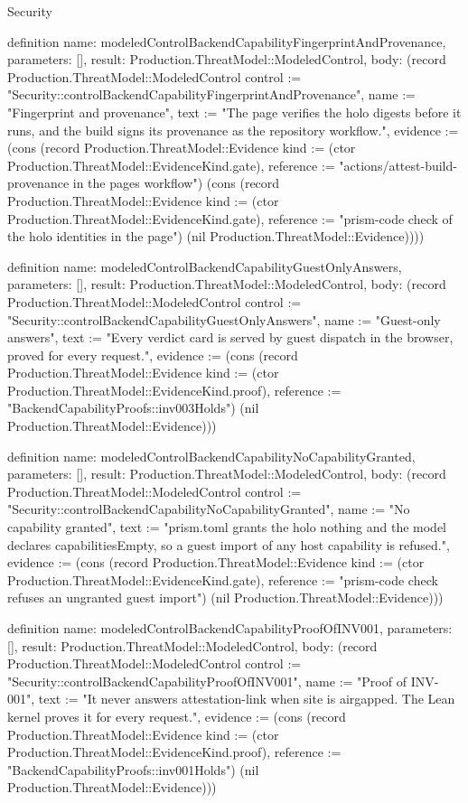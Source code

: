 \begin{lexlean}{Security}
\begin{semanticmodule}
definition{
  name: modeledControlBackendCapabilityFingerprintAndProvenance,
  parameters: [],
  result: Production.ThreatModel::ModeledControl,
  body: (record Production.ThreatModel::ModeledControl {control := "Security::controlBackendCapabilityFingerprintAndProvenance", name := "Fingerprint and provenance", text := "The page verifies the holo digests before it runs, and the build signs its provenance as the repository workflow.", evidence := (cons (record Production.ThreatModel::Evidence {kind := (ctor Production.ThreatModel::EvidenceKind.gate), reference := "actions/attest-build-provenance in the pages workflow"}) (cons (record Production.ThreatModel::Evidence {kind := (ctor Production.ThreatModel::EvidenceKind.gate), reference := "prism-code check of the holo identities in the page"}) (nil Production.ThreatModel::Evidence)))})
}

definition{
  name: modeledControlBackendCapabilityGuestOnlyAnswers,
  parameters: [],
  result: Production.ThreatModel::ModeledControl,
  body: (record Production.ThreatModel::ModeledControl {control := "Security::controlBackendCapabilityGuestOnlyAnswers", name := "Guest-only answers", text := "Every verdict card is served by guest dispatch in the browser, proved for every request.", evidence := (cons (record Production.ThreatModel::Evidence {kind := (ctor Production.ThreatModel::EvidenceKind.proof), reference := "BackendCapabilityProofs::inv003Holds"}) (nil Production.ThreatModel::Evidence))})
}

definition{
  name: modeledControlBackendCapabilityNoCapabilityGranted,
  parameters: [],
  result: Production.ThreatModel::ModeledControl,
  body: (record Production.ThreatModel::ModeledControl {control := "Security::controlBackendCapabilityNoCapabilityGranted", name := "No capability granted", text := "prism.toml grants the holo nothing and the model declares capabilitiesEmpty, so a guest import of any host capability is refused.", evidence := (cons (record Production.ThreatModel::Evidence {kind := (ctor Production.ThreatModel::EvidenceKind.gate), reference := "prism-code check refuses an ungranted guest import"}) (nil Production.ThreatModel::Evidence))})
}

definition{
  name: modeledControlBackendCapabilityProofOfINV001,
  parameters: [],
  result: Production.ThreatModel::ModeledControl,
  body: (record Production.ThreatModel::ModeledControl {control := "Security::controlBackendCapabilityProofOfINV001", name := "Proof of INV-001", text := "It never answers attestation-link when site is airgapped. The Lean kernel proves it for every request.", evidence := (cons (record Production.ThreatModel::Evidence {kind := (ctor Production.ThreatModel::EvidenceKind.proof), reference := "BackendCapabilityProofs::inv001Holds"}) (nil Production.ThreatModel::Evidence))})
}


\end{semanticmodule}
\end{lexlean}
